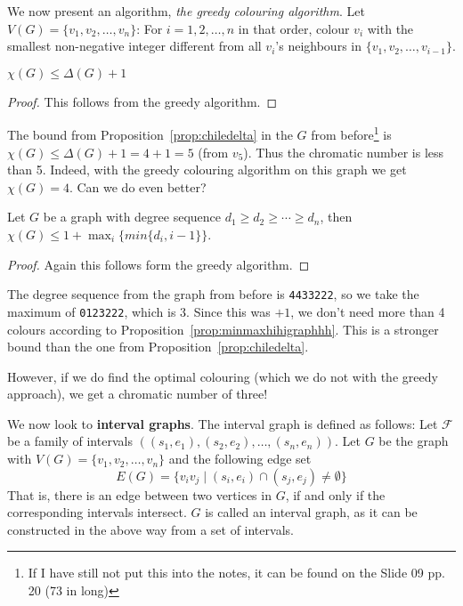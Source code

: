 We now present an algorithm, \textit{the greedy colouring algorithm}. Let $V(G) = \{v_{1}, v_{2}, \ldots, v_{n}\}$: For $i = 1, 2, \ldots, n$ in that order, colour $v_{i}$ with the smallest non-negative integer different from all $v_{i}$'s neighbours in $\{v_{1}, v_{2}, \ldots, v_{i-1}\}$.

\begin{proposition}
	\label{prop:chiledelta}
	$\chi (G) \le \Delta(G)+1$
\end{proposition}

\begin{proof}
	This follows from the greedy algorithm.
\end{proof}

The bound from Proposition~\ref{prop:chiledelta} in the $G$ from before\footnote{If I have still not put this into the notes, it can be found on the Slide 09 pp. 20 (73 in long)} is $\chi(G) \le \Delta(G) + 1 = 4 + 1 = 5$ (from $v_{5}$). Thus the chromatic number is less than 5. Indeed, with the greedy colouring algorithm on this graph we get $\chi(G) = 4$. Can we do even better?


\begin{proposition}
	\label{prop:minmaxhihigraphhh}
	Let $G$ be a graph with degree sequence $d_{1} \ge d_{2} \ge \cdots \ge d_{n}$, then $\chi(G) \le 1 + \max_{i}\{min\{d_{i}, i-1\}\}$.
\end{proposition}

\begin{proof}
	Again this follows form the greedy algorithm.
\end{proof}

The degree sequence from the graph from before is \texttt{4433222}, so we take the maximum of \texttt{0123222}, which is $3$. Since this was $+1$, we don't need more than 4 colours according to Proposition~\ref{prop:minmaxhihigraphhh}. This is a stronger bound than the one from Proposition~\ref{prop:chiledelta}.

However, if we do find the optimal colouring (which we do not with the greedy approach), we get a chromatic number of three!


We now look to \textbf{interval graphs}. The interval graph is defined as follows: Let $\mathcal{F}$ be a family of intervals $((s_{1}, e_{1}), (s_{2}, e_{2}), \ldots, (s_{n}, e_{n}))$. Let $G$ be the graph with $V(G) = \{v_{1}, v_{2}, \ldots, v_{n}\}$ and the following edge set
\[
	E(G) = \{v_{i}v_{j} \mid (s_{i},e_{i}) \cap (s_{j},e_{j}) \ne \emptyset\}
\]
That is, there is an edge between two vertices in $G$, if and only if the corresponding intervals intersect. $G$ is called an interval graph, as it can be constructed in the above way from a set of intervals.

